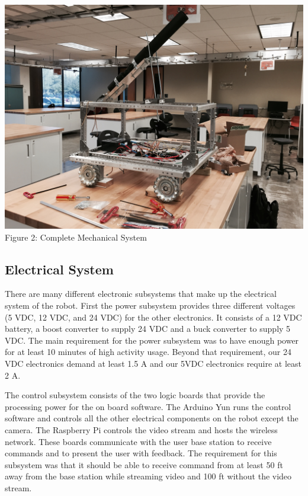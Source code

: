 \documentclass[letterpaper,12pt]{article}
\begin{document}
\begin{center}
    \includegraphics[width=15cm]{./pics/chassis/robot.jpg}
    Figure 2: Complete Mechanical System
\end{center}

\subsection{Electrical System}
There are many different electronic subsystems that make up the electrical system of the robot. First the power subsystem provides three different voltages (5 VDC,  12 VDC, and 24 VDC) for the other electronics. It consists of a 12 VDC battery, a boost converter to supply 24 VDC and a buck converter to supply 5 VDC. The main requirement for the power subsystem was to have enough power for at least 10 minutes of high activity usage. Beyond that requirement, our 24 VDC electronics demand at least 1.5 A and our 5VDC electronics require at least 2 A.

The control subsystem consists of the two logic boards that provide the processing power for the on board software. The Arduino Yun runs the control software and controls all the other electrical components on the robot except the camera. The Raspberry Pi controls the video stream and hosts the wireless network. These boards communicate with the user base station to receive commands and to present the user with feedback. The requirement for this subsystem was that it should be able to receive command from at least 50 ft away from the base station while streaming video and 100 ft without the video stream. 
\end{document}
